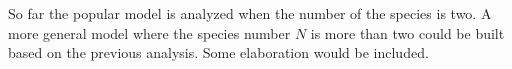 So far the popular model is analyzed when the number of the species is two. A more general model where the species number $N$ is more than two could be built based on the previous analysis. Some elaboration would be included.